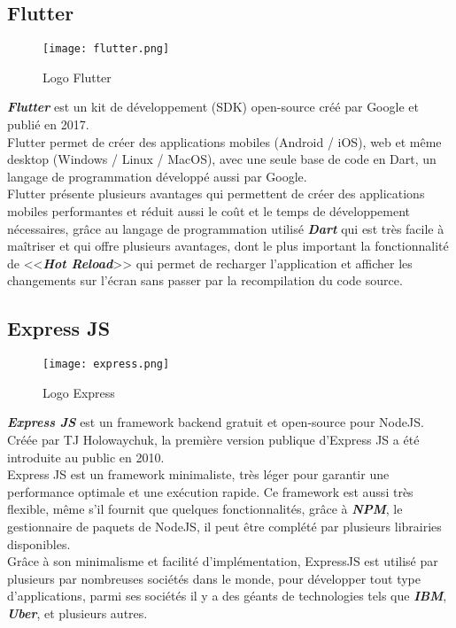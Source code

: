 \subsection{Flutter}
\vspace{1cm}
\begin{figure}[H]
    \centering
    \texttt{[image: flutter.png]}
    \vspace{1cm}
    \captionsetup{justification=centering}

    \caption{Logo Flutter}
    \label{fig:flutter_logo}
\end{figure}
\textit{\textbf{Flutter}} \cite{flutter} est un kit de développement (SDK) open-source créé par Google et publié en 2017.\\
\noindent Flutter permet de créer des applications mobiles (Android / iOS), web et même desktop (Windows / Linux / MacOS), avec une seule base de code en Dart, un langage de programmation développé aussi par Google. \\
\noindent Flutter présente plusieurs avantages qui permettent de créer des applications mobiles performantes et réduit aussi le coût et le temps de développement nécessaires, grâce au langage de programmation utilisé \textit{\textbf{Dart}} qui est très facile à maîtriser et qui offre plusieurs avantages, dont le plus important la fonctionnalité de <<\textit{\textbf{Hot Reload}}>> qui permet de recharger l'application et afficher les changements sur l'écran sans passer par la recompilation du code source.
\subsection{Express JS}
\vspace{1cm}
\begin{figure}[H]
    \centering
    \texttt{[image: express.png]}
    \vspace{1cm}
    \captionsetup{justification=centering}
    \caption{Logo Express}
    \label{fig:express_logo}
\end{figure}
\textit{\textbf{Express JS}} \cite{expressjs} est un framework backend gratuit et open-source pour NodeJS. Créée par TJ Holowaychuk, la première version publique d'Express JS a été introduite au public en 2010.\\
Express JS est un framework minimaliste, très léger pour garantir une performance optimale et une exécution rapide. Ce framework est aussi très flexible, même s'il fournit que quelques fonctionnalités, grâce à \textit{\textbf{NPM}}, le gestionnaire de paquets de NodeJS, il peut être complété par plusieurs librairies disponibles.\\
\noindent Grâce à son minimalisme et facilité d'implémentation, ExpressJS est utilisé par plusieurs par nombreuses sociétés dans le monde, pour développer tout type d'applications, parmi ses sociétés il y a des géants de technologies tels que \textit{\textbf{IBM}}, \textit{\textbf{Uber}}, et plusieurs autres.
